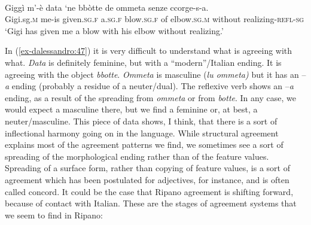 \documentclass[output=paper
,modfonts
,nonflat]{langsci/langscibook}
\begin{document}
\begin{exe}
	\ex \label{ex-dalessandro:47}\citet[113]{Rossi2008}\\
	\gll Giggì   m’-è   data     ‘ne   bbòtte     de   ommeta senze    ccorge-s-a.\\
	Gigi.sg.\textsc{m} me-is  given.\textsc{sg.f}  a.\textsc{sg.f} blow.\textsc{sg.f} of  elbow.\textsc{sg.m} without  realizing-\textsc{refl-sg}\\
	\glt `Gigi has given me a blow with his elbow without realizing.'
\end{exe}
In (\ref{ex-dalessandro:47}) it is very difficult to understand what is agreeing with what. \textit{Data} is definitely feminine, but with a “modern”/Italian ending. It is agreeing with the object \textit{bbotte}. \textit{Ommeta} is masculine (\textit{lu ommeta)} but it has an –\textit{a} ending (probably a residue of a neuter/dual). The reflexive verb shows an –\textit{a} ending, as a result of the spreading from \textit{ommeta} or from \textit{botte}. In any case, we would expect a masculine there, but we find a feminine or, at best, a neuter/masculine. This piece of data shows, I think, that there is a sort of inflectional harmony going on in the language. While structural agreement explains most of the agreement patterns we find, we sometimes see a sort of spreading of the morphological ending rather than of the feature values. 
Spreading of a surface form, rather than copying of feature values, is a sort of agreement which has been postulated for adjectives, for instance, and is often called concord. It could be the case that Ripano agreement is shifting forward, because of contact with Italian.
These are the stages of agreement systems that we seem to find in Ripano:
\end{document}
